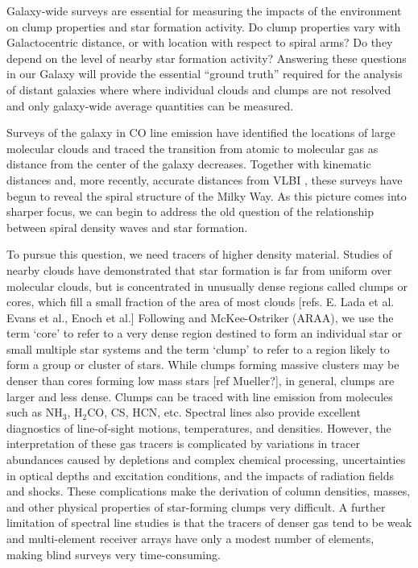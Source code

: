 \documentclass[12pt,preprint]{aastex}
\newcommand{\ammonia}{\mbox{{\rm NH}$_3$}}
\newcommand{\form}{H$_2$CO}
\begin{document}
Galaxy-wide surveys are essential for measuring the impacts of the
environment on clump properties and star formation activity.
Do clump properties vary with Galactocentric distance, or
with location with respect to spiral arms?  Do they depend on the
level of nearby star formation activity?
Answering these questions in our Galaxy will provide the
essential ``ground truth'' required for the analysis of distant
galaxies where where individual clouds and clumps are not resolved and
only galaxy-wide average quantities can be measured.

Surveys of the galaxy in CO line emission \citep{dame01,FCRAO} have
identified the locations of large molecular clouds and traced
the transition from atomic to molecular gas as distance from the
center of the galaxy decreases. Together with kinematic distances
\citep[e.g.][]{RotationCurve} and, more recently, accurate distances
from VLBI \citep{reid09}, these surveys have begun to
reveal the spiral structure of the Milky Way. As this picture comes into
sharper focus, we can begin to address the old question of the relationship
between spiral density waves and star formation.

To pursue this question, we need tracers of higher density material.
Studies of nearby clouds have demonstrated that star formation is far
from uniform over molecular clouds, but is concentrated in unusually dense
regions called clumps or cores, which fill a small fraction of the area
of most clouds [refs. E. Lada et al. Evans et al., Enoch et al.]
Following \citet{williams00} and McKee-Ostriker (ARAA), we
use the term `core' to refer to a very dense region destined to form an
individual star or small multiple star systems and the term `clump' to
refer to a
region likely to form a group or cluster of stars. While clumps forming
massive clusters may be denser than cores forming low mass stars
[ref Mueller?],
in general, clumps are larger and less dense. Clumps can be traced
with line emission from molecules such as \ammonia, \form, CS, HCN, etc.
Spectral lines also provide excellent diagnostics of
line-of-sight motions, temperatures, and densities.
However, the interpretation of these gas tracers is complicated by
variations in tracer abundances caused by depletions and complex
chemical processing, uncertainties in optical depths and excitation
conditions, and the impacts of radiation fields and shocks. These
complications make the derivation of column densities, masses, and
other physical properties of star-forming clumps very difficult.
A further limitation of spectral line studies is that the tracers of
denser gas tend to be weak and multi-element receiver arrays have
only a modest number of elements, making blind surveys very time-consuming.
\end{document}
